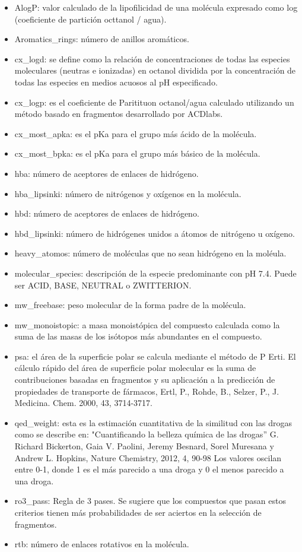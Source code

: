 \begin{itemize}
\item AlogP: valor calculado de la lipofilicidad de una molécula expresado como log (coeficiente de partición octtanol / agua).
\item Aromatics\_rings: número de anillos aromáticos.
\item cx\_logd: se define como la relación de concentraciones de todas las especies moleculares (neutras e ionizadas) en octanol dividida por la concentración de todas las especies en medios acuosos al pH especificado.
\item cx\_logp: es el coeficiente de Paritituon octanol/agua calculado utilizando un método basado en fragmentos desarrollado por ACDlabs. 
\item cx\_most\_apka: es el pKa para el grupo más ácido de la molécula.
\item cx\_most\_bpka: es el pKa para el grupo más básico de la molécula.
\item hba: número de aceptores de enlaces de hidrógeno.
\item hba\_lipsinki: número de nitrógenos y oxígenos en la molécula.
\item hbd: número de aceptores de enlaces de hidrógeno.
\item hbd\_lipsinki: número de hidrógenes unidos a átomos de nitrógeno u oxígeno.
\item heavy\_atomos: número de moléculas que no sean hidrógeno en la moléula.
\item molecular\_species: descripción de la especie predominante con pH 7.4. Puede ser ACID, BASE, NEUTRAL o ZWITTERION.
\item mw\_freebase: peso molecular de la forma padre de la molécula.
\item mw\_monoistopic: a masa monoistópica del compuesto calculada como la suma de las masas de los isótopos más abundantes en el compuesto.
\item psa: el área de la superficie polar se calcula mediante el método de P Erti. El cálculo rápido del área de superficie polar molecular es la suma de contribuciones basadas en fragmentos y su aplicación a la predicción de propiedades de transporte de fármacos, Ertl, P., Rohde, B., Selzer, P., J. Medicina. Chem. 2000, 43, 3714-3717.
\item qed\_weight: esta es la estimación cuantitativa de la similitud con las drogas como se describe en: "Cuantificando la belleza química de las drogas” G. Richard Bickerton, Gaia V. Paolini, Jeremy Besnard, Sorel Muresana y Andrew L. Hopkins, Nature Chemistry, 2012, 4, 90-98 Los valores oscilan entre 0-1, donde 1 es el más parecido a una droga y 0 el menos parecido a una droga.
\item ro3\_pass: Regla de 3 pases. Se sugiere que los compuestos que pasan estos criterios tienen más probabilidades de ser aciertos en la selección de fragmentos.
\item rtb: número de enlaces rotativos en la molécula.

\end{itemize}

\newpage